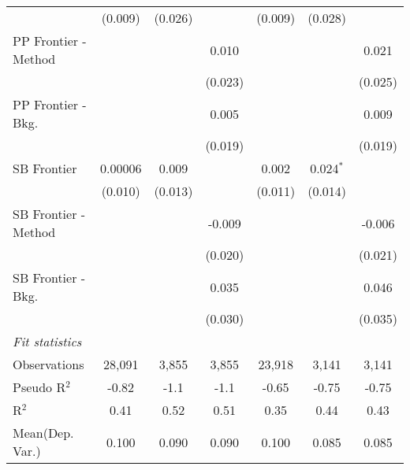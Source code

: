 \begin{tabular}{lcccccc}
                        & (0.009)     & (0.026)        &         & (0.009)     & (0.028)     &   \\   
   PP Frontier - Method &             &                & 0.010   &             &             & 0.021\\   
                        &             &                & (0.023) &             &             & (0.025)\\   
   PP Frontier - Bkg.   &             &                & 0.005   &             &             & 0.009\\   
                        &             &                & (0.019) &             &             & (0.019)\\   
   SB Frontier          & 0.00006     & 0.009          &         & 0.002       & 0.024$^{*}$ &   \\   
                        & (0.010)     & (0.013)        &         & (0.011)     & (0.014)     &   \\   
   SB Frontier - Method &             &                & -0.009  &             &             & -0.006\\   
                        &             &                & (0.020) &             &             & (0.021)\\   
   SB Frontier - Bkg.   &             &                & 0.035   &             &             & 0.046\\   
                        &             &                & (0.030) &             &             & (0.035)\\   
   \midrule
   \emph{Fit statistics}\\
   Observations         & 28,091      & 3,855          & 3,855   & 23,918      & 3,141       & 3,141\\  
   Pseudo R$^2$         & -0.82       & -1.1           & -1.1    & -0.65       & -0.75       & -0.75\\  
   R$^2$                & 0.41        & 0.52           & 0.51    & 0.35        & 0.44        & 0.43\\  
Mean(Dep. Var.) & 0.100 & 0.090 & 0.090 & 0.100 & 0.085 & 0.085 \\
   

\end{tabular}
